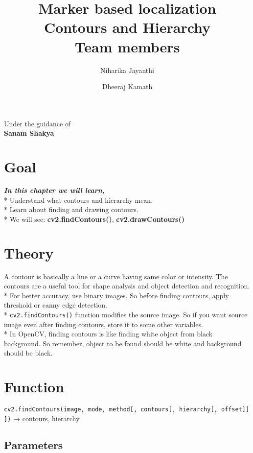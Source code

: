 \documentclass[]{article}
\date{}
\title {Marker based localization \\ [10pt]
	Contours and Hierarchy  \\[25pt] Team members }
\author {Niharika Jayanthi \and Dheeraj Kamath}
\begin{document}
\maketitle
\begin{center}
	\begin{large}
		Under the guidance of\\
		\textbf{Sanam Shakya}\\
		\vspace{0.5in}
	\end{large}
\end{center}
\section{Goal}\label{goal}

\emph{\textbf{In this chapter we will learn,}}\\
* Understand what contours and hierarchy mean.\\
* Learn about finding and drawing contours.\\
* We will see: \textbf{cv2.findContours()}, \textbf{cv2.drawContours()}

\section{Theory}\label{theory}

A contour is basically a line or a curve having same color or intensity.
The contours are a useful tool for shape analysis and object detection
and recognition. * For better accuracy, use binary images. So before
finding contours, apply threshold or canny edge detection.\\
* \texttt{cv2.findContours()} function modifies the source image. So if
you want source image even after finding contours, store it to some
other variables.\\
* In OpenCV, finding contours is like finding white object from black
background. So remember, object to be found should be white and
background should be black.

\section{Function}\label{function}

\texttt{cv2.findContours(image,\ mode,\ method{[},\ contours{[},\ hierarchy{[},\ offset{]}{]}{]})}
→ contours, hierarchy

\subsection{Parameters}\label{parameters}
\end{document}
